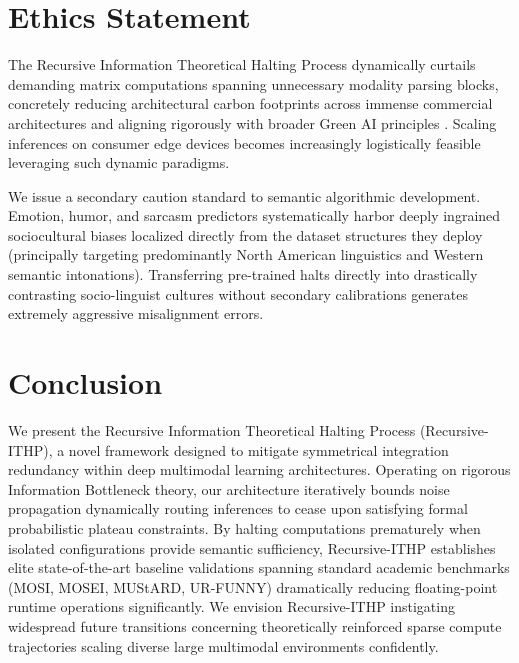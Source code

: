 \documentclass[11pt]{article}
\begin{document}
\section{Ethics Statement}
The Recursive Information Theoretical Halting Process dynamically curtails demanding matrix computations spanning unnecessary modality parsing blocks, concretely reducing architectural carbon footprints across immense commercial architectures and aligning rigorously with broader Green AI principles \citep{schwartz2020green}. Scaling inferences on consumer edge devices becomes increasingly logistically feasible leveraging such dynamic paradigms.

We issue a secondary caution standard to semantic algorithmic development. Emotion, humor, and sarcasm predictors systematically harbor deeply ingrained sociocultural biases localized directly from the dataset structures they deploy (principally targeting predominantly North American linguistics and Western semantic intonations). Transferring pre-trained halts directly into drastically contrasting socio-linguist cultures without secondary calibrations generates extremely aggressive misalignment errors.

\section{Conclusion}
\label{sec:conclusion}
We present the Recursive Information Theoretical Halting Process (Recursive-ITHP), a novel framework designed to mitigate symmetrical integration redundancy within deep multimodal learning architectures. Operating on rigorous Information Bottleneck theory, our architecture iteratively bounds noise propagation dynamically routing inferences to cease upon satisfying formal probabilistic plateau constraints. By halting computations prematurely when isolated configurations provide semantic sufficiency, Recursive-ITHP establishes elite state-of-the-art baseline validations spanning standard academic benchmarks (MOSI, MOSEI, MUStARD, UR-FUNNY) dramatically reducing floating-point runtime operations significantly. We envision Recursive-ITHP instigating widespread future transitions concerning theoretically reinforced sparse compute trajectories scaling diverse large multimodal environments confidently.



\end{document}
